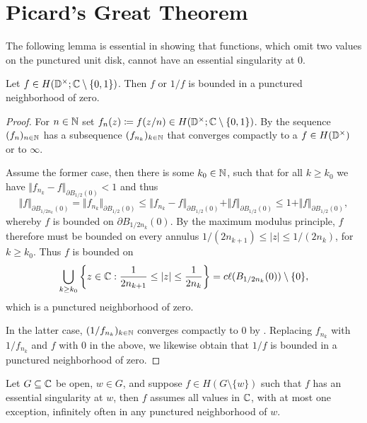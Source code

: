 \section{Picard's Great Theorem}
\label{sec:picards-great-theorem}

The following lemma is essential in showing that functions, which omit two values on the punctured unit disk, cannot have an essential singularity at $0$.

\begin{lemma} \label{lem:great-picard-bounded}
    Let $f \in H(\mathbb{D}^\times; \mathbb{C} \setminus \{ 0, 1 \})$. Then $f$ or $1/f$ is bounded in a punctured neighborhood of zero.
\end{lemma}

\begin{proof}
    For $n \in \mathbb{N}$ set $f_n(z) \coloneqq f(z / n) \in H(\mathbb{D}^\times; \mathbb{C} \setminus \{ 0, 1 \})$. By  the sequence $(f_n)_{n \in \mathbb{N}}$ has a subsequence $(f_{n_k})_{k \in \mathbb{N}}$ that converges compactly to a $f \in H(\mathbb{D}^\times)$ or to $\infty$.

    Assume the former case, then there is some $k_0 \in \mathbb{N}$, such that for all $k \geq k_0$ we have $ \Vert f_{n_k} - f \Vert_{\partial B_{1/2}(0)} < 1 $ and thus
    \begin{equation*}
        \Vert f \Vert_{\partial B_{1/2n_k}(0)} = \Vert f_{n_k} \Vert_{\partial B_{1/2}(0)} \leq \Vert f_{n_k} - f \Vert_{\partial B_{1/2}(0)} + \Vert f \Vert_{\partial B_{1/2}(0)} \leq 1 + \Vert f \Vert_{\partial B_{1/2}(0)},
    \end{equation*}
    whereby $f$ is bounded on $\partial B_{1/2n_k}(0)$. By the maximum modulus principle, $f$ therefore must be bounded on every annulus $1 / (2 n_{k + 1}) \leq \vert z \vert \leq 1 / (2 n_k)$, for $k \geq k_0$. Thus $f$ is bounded on
    $$ \bigcup_{k \geq k_0} \left\{ z \in \mathbb{C} : \frac{1}{2 n_{k+1}} \leq \vert z \vert \leq \frac{1}{2 n_k} \right\} = c\ell({B_{1/2n_k}(0)}) \setminus \{ 0 \}, $$
    which is a punctured neighborhood of zero.

    In the latter case, $(1 / f_{n_k})_{k \in \mathbb{N}}$ converges compactly to $0$ by . Replacing $f_{n_k}$ with $1 / f_{n_k}$ and $f$ with $0$ in the above, we likewise obtain that $1 / f$ is bounded in a punctured neighborhood of zero.
\end{proof}

\begin{theorem} \label{thm:picards-great-theorem}
    Let $G \subseteq \mathbb{C}$ be open, $w \in G$, and suppose $f \in H(G \setminus \{ w \})$ such that $f$ has an essential singularity at $w$, then $f$ assumes all values in $\mathbb{C}$, with at most one exception, infinitely often in any punctured neighborhood of $w$.
\end{theorem}

